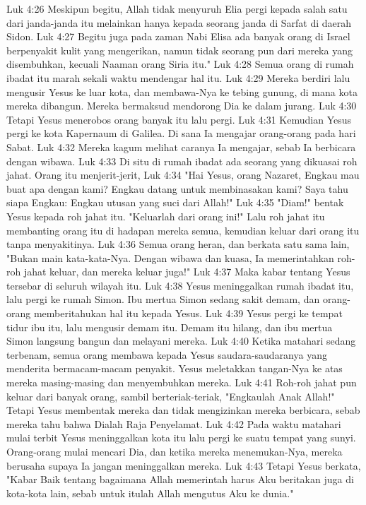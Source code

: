 Luk 4:26  Meskipun begitu, Allah tidak menyuruh Elia pergi kepada salah satu dari janda-janda itu melainkan hanya kepada seorang janda di Sarfat di daerah Sidon.
Luk 4:27  Begitu juga pada zaman Nabi Elisa ada banyak orang di Israel berpenyakit kulit yang mengerikan, namun tidak seorang pun dari mereka yang disembuhkan, kecuali Naaman orang Siria itu."
Luk 4:28  Semua orang di rumah ibadat itu marah sekali waktu mendengar hal itu.
Luk 4:29  Mereka berdiri lalu mengusir Yesus ke luar kota, dan membawa-Nya ke tebing gunung, di mana kota mereka dibangun. Mereka bermaksud mendorong Dia ke dalam jurang.
Luk 4:30  Tetapi Yesus menerobos orang banyak itu lalu pergi.
Luk 4:31  Kemudian Yesus pergi ke kota Kapernaum di Galilea. Di sana Ia mengajar orang-orang pada hari Sabat.
Luk 4:32  Mereka kagum melihat caranya Ia mengajar, sebab Ia berbicara dengan wibawa.
Luk 4:33  Di situ di rumah ibadat ada seorang yang dikuasai roh jahat. Orang itu menjerit-jerit,
Luk 4:34  "Hai Yesus, orang Nazaret, Engkau mau buat apa dengan kami? Engkau datang untuk membinasakan kami? Saya tahu siapa Engkau: Engkau utusan yang suci dari Allah!"
Luk 4:35  "Diam!" bentak Yesus kepada roh jahat itu. "Keluarlah dari orang ini!" Lalu roh jahat itu membanting orang itu di hadapan mereka semua, kemudian keluar dari orang itu tanpa menyakitinya.
Luk 4:36  Semua orang heran, dan berkata satu sama lain, "Bukan main kata-kata-Nya. Dengan wibawa dan kuasa, Ia memerintahkan roh-roh jahat keluar, dan mereka keluar juga!"
Luk 4:37  Maka kabar tentang Yesus tersebar di seluruh wilayah itu.
Luk 4:38  Yesus meninggalkan rumah ibadat itu, lalu pergi ke rumah Simon. Ibu mertua Simon sedang sakit demam, dan orang-orang memberitahukan hal itu kepada Yesus.
Luk 4:39  Yesus pergi ke tempat tidur ibu itu, lalu mengusir demam itu. Demam itu hilang, dan ibu mertua Simon langsung bangun dan melayani mereka.
Luk 4:40  Ketika matahari sedang terbenam, semua orang membawa kepada Yesus saudara-saudaranya yang menderita bermacam-macam penyakit. Yesus meletakkan tangan-Nya ke atas mereka masing-masing dan menyembuhkan mereka.
Luk 4:41  Roh-roh jahat pun keluar dari banyak orang, sambil berteriak-teriak, "Engkaulah Anak Allah!" Tetapi Yesus membentak mereka dan tidak mengizinkan mereka berbicara, sebab mereka tahu bahwa Dialah Raja Penyelamat.
Luk 4:42  Pada waktu matahari mulai terbit Yesus meninggalkan kota itu lalu pergi ke suatu tempat yang sunyi. Orang-orang mulai mencari Dia, dan ketika mereka menemukan-Nya, mereka berusaha supaya Ia jangan meninggalkan mereka.
Luk 4:43  Tetapi Yesus berkata, "Kabar Baik tentang bagaimana Allah memerintah harus Aku beritakan juga di kota-kota lain, sebab untuk itulah Allah mengutus Aku ke dunia."
